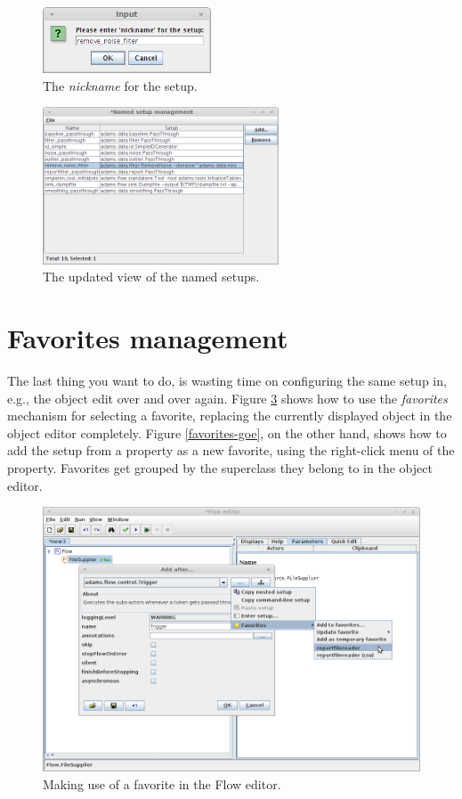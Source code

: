 \begin{figure}[htb]
  \centering
  \includegraphics[width=5.0cm]{images/namedsetupmanagement-add3.png}
  \caption{The \textit{nickname} for the setup.}
  \label{namedsetupmanagement-add3}
\end{figure}

\begin{figure}[htb]
  \centering
  \includegraphics[width=7.0cm]{images/namedsetupmanagement-add4.png}
  \caption{The updated view of the named setups.}
  \label{namedsetupmanagement-add4}
\end{figure}

\clearpage \newpage
\section{Favorites management}
The last thing you want to do, is wasting time on configuring the same setup in,
e.g., the object edit over and over again. Figure \ref{favorites-floweditor}
shows how to use the \textit{favorites} mechanism for selecting a favorite,
replacing the currently displayed object in the object editor completely. Figure
\ref{favorites-goe}, on the other hand, shows how to add the setup from a
property as a new favorite, using the right-click menu of the property.
Favorites get grouped by the superclass they belong to in the object editor.

\begin{figure}[htb]
  \centering
  \includegraphics[width=12.0cm]{images/favorites-floweditor.png}
  \caption{Making use of a favorite in the Flow editor.}
  \label{favorites-floweditor}
\end{figure}


